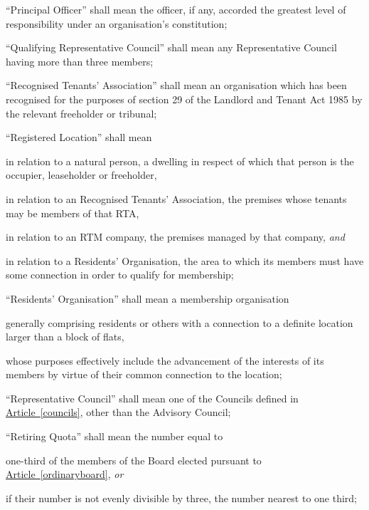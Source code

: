 \documentclass[12pt]{article}
\newcommand{\EC}[0]{Board}
\newcommand{\Exec}[0]{\EC{} }
\newcommand{\RA}[0]{Residents' Organisation}
\newcommand{\RTA}[0]{Recognised Tenants' Association}
\newcommand{\ITand}[0]{\textit{and}}
\newcommand{\ITor}[0]{\textit{or}}
\newcommand{\definition}[2]{\item ``#1'' shall mean #2}
\newcommand{\articleref}[1]{\hyperref[#1]{Article~\ref*{#1}}}
\begin{document}
\begin{constenum}
    \definition{Principal Officer}{the officer, if any, accorded
      the greatest level of responsibility under an organisation's
      constitution};

    \definition{Qualifying Representative Council}{any Representative Council
      having more than three members};

    \definition{\RTA{}}{an organisation which has been recognised for
      the purposes of section 29 of the Landlord and Tenant Act 1985 by
      the relevant freeholder or tribunal};

    \definition{Registered Location}{
      \begin{constenum}
        \item in relation to a natural person, a dwelling in respect
          of which that person is the occupier, leaseholder or freeholder,
        \item in relation to an Recognised Tenants' Association, the
          premises whose tenants may be members of that RTA,
        \item in relation to an RTM company, the premises managed by that
          company, \ITand
        \item in relation to a \RA{}, the area to which its members must
          have some connection in order to qualify for membership;
      \end{constenum}
    }

    \definition{\RA}{a membership organisation
      \begin{constenum}
        \item generally comprising residents or others with a connection
          to a definite location larger than a block of flats,
        \item whose purposes effectively include the advancement of
          the interests of its members by virtue of their common
          connection to the location;
      \end{constenum}
    }

    \definition{Representative Council}{one of the Councils defined in
      \articleref{councils}, other than the
      Advisory Council};

    \definition{Retiring Quota}{the number equal to
      \begin{constenum}
      \item one-third of the members of the \Exec elected pursuant to
        \articleref{ordinaryboard}, \ITor
      \item if their number is not evenly divisible by three, the
        number nearest to one third;
      \end{constenum}
    }


\end{constenum}
\end{document}
